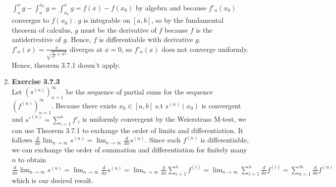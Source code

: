 \documentclass[10pt]{article}
\begin{document}
\begin{enumerate}[label=Problem \arabic*.]
$\displaystyle\int_{a}^{x}g-\int_{a}^{x_0}g=\int_{x_0}^{x}g=f(x)-f(x_0)$ by algebra and because $f'_n(x_0)$ converges to $f(x_0)$. $g$ is integrable on $[a,b]$, so by the fundamental theorem of calculus, $g$ must be the derivative of $f$ because $f$ is the antiderivative of $g$. Hence, $f$ is differentiable with derivative $g$.
$f'_n(x)=\frac{x}{\sqrt{\frac{1}{n^2}+x^2}}$ diverges at $x=0$, so $f'_n(x)$ does not converge uniformly. Hence, theorem 3.7.1 doesn't apply.
\item \textbf{Exercise 3.7.3}\\
Let $(s^{(n)})^\infty_{n=1}$ be the sequence of partial sums for the sequence $(f^{(n)})^\infty_{n=1}$.
Because there exists $x_0\in[a,b]$ s.t $s^{(n)}(x_0)$ is convergent and $s'^{(n)}=\displaystyle{\sum_{i=1}^{n}}f'_i$ is uniformly convergent by the Weierstrass M-test, we can use Theorem 3.7.1 to exchange the order of limits and differentiation.
It follows $\frac{d}{dx}\displaystyle{\lim_{n\rightarrow\infty}}s^{(n)}=\displaystyle{\lim_{n\rightarrow\infty}}\frac{d}{dx}s^{(n)}$.
Since each $f^{(n)}$ is differentiable, we can exchange the order of summation and differentiation for finitely many $n$ to obtain $\frac{d}{dx}\displaystyle{\lim_{n\rightarrow\infty}}s^{(n)}=\displaystyle{\lim_{n\rightarrow\infty}}\frac{d}{dx}s^{(n)}=\displaystyle{\lim_{n\rightarrow\infty}}\frac{d}{dx}\sum_{i=1}^{n}f^{(i)}=\displaystyle{\lim_{n\rightarrow\infty}}\sum_{i=1}^{n}\frac{d}{dx}f^{(i)}=\sum_{n=1}^{\infty}\frac{d}{dx}f^{(n)}$ which is our desired result.

\end{enumerate}
\end{document}
